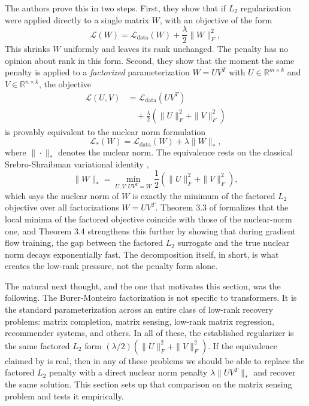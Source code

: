 The authors prove this in two steps. First, they show that if $L_2$ regularization were applied directly to a single matrix $W$, with an objective of the form
\begin{equation}
    \mathcal{L}(W) = \mathcal{L}_{\text{data}}(W) + \frac{\lambda}{2} \|W\|_F^2,
\end{equation}
This shrinks $W$ uniformly and leaves its rank unchanged. The penalty has no opinion about rank in this form. Second, they show that the moment the same penalty is applied to a \textit{factorized} parameterization $W = UV^T$ with $U \in \mathbb{R}^{m \times k}$ and $V \in \mathbb{R}^{n \times k}$, the objective
\begin{equation}
\begin{aligned}
    \mathcal{L}(U, V) &= \mathcal{L}_{\text{data}}(UV^T) \\
    &\quad + \frac{\lambda}{2}\left(\|U\|_F^2 + \|V\|_F^2\right)
\end{aligned}
\end{equation}
is provably equivalent to the nuclear norm formulation
\begin{equation}
    \mathcal{L}_*(W) = \mathcal{L}_{\text{data}}(W) + \lambda \|W\|_*,
\end{equation}
where $\|\cdot\|_*$ denotes the nuclear norm. The equivalence rests on the classical Srebro-Shraibman variational identity \cite{srebroshraibman2005},
\begin{equation}
    \|W\|_* = \min_{U, V : UV^T = W} \frac{1}{2}\left(\|U\|_F^2 + \|V\|_F^2\right),
\end{equation}
which says the nuclear norm of $W$ is exactly the minimum of the factored $L_2$ objective over all factorizations $W = UV^T$. Theorem 3.3 of \cite{kobayashi2024lowrank} formalizes that the local minima of the factored objective coincide with those of the nuclear-norm one, and Theorem 3.4 strengthens this further by showing that during gradient flow training, the gap between the factored $L_2$ surrogate and the true nuclear norm decays exponentially fast. The decomposition itself, in short, is what creates the low-rank pressure, not the penalty form alone.

The natural next thought, and the one that motivates this section, was the following. The Burer-Monteiro factorization is not specific to transformers. It is the standard parameterization across an entire class of low-rank recovery problems: matrix completion, matrix sensing, low-rank matrix regression, recommender systems, and others. In all of these, the established regularizer is the same factored $L_2$ form $(\lambda/2)(\|U\|_F^2 + \|V\|_F^2)$. If the equivalence claimed by \cite{kobayashi2024lowrank} is real, then in any of these problems we should be able to replace the factored $L_2$ penalty with a direct nuclear norm penalty $\lambda \|UV^T\|_*$ and recover the same solution. This section sets up that comparison on the matrix sensing problem and tests it empirically.



